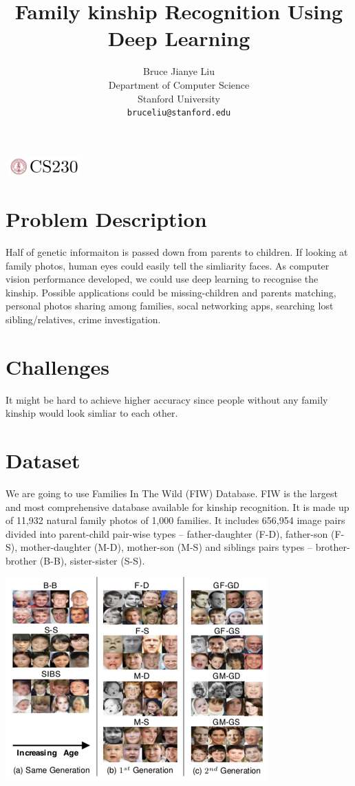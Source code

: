 \documentclass{article}
\title{Family kinship Recognition Using Deep Learning}
\author{
  Bruce Jianye Liu\\
  Department of Computer Science\\
  Stanford University\\
  \texttt{bruceliu@stanford.edu} \\
}
\begin{document}

\begin{center}
\includegraphics[width=3cm, height=0.7cm]{CS230}
\end{center}

\maketitle

\section{Problem Description}
Half of genetic informaiton is passed down from parents to children. If looking
at family photos, human eyes could easily tell the simliarity faces. As
computer vision performance developed, we could use deep learning to recognise
the kinship. Possible applications could be missing-children and parents
matching, personal photos sharing among families, socal networking apps,
searching lost sibling/relatives, crime investigation.

\section{Challenges}
It might be hard to achieve higher accuracy since people without any family kinship would look simliar to each other.

\section{Dataset}
We are going to use Families In The Wild (FIW) Database. FIW is the largest and
most comprehensive database available for kinship recognition. It is made up of
11,932 natural family photos of 1,000 families. It includes 656,954 image pairs
divided into parent-child pair-wise types -- father-daughter (F-D), father-son
(F-S), mother-daughter (M-D), mother-son (M-S) and siblings pairs types --
brother-brother (B-B), sister-sister (S-S).

\includegraphics{facepairs}
\end{document}
